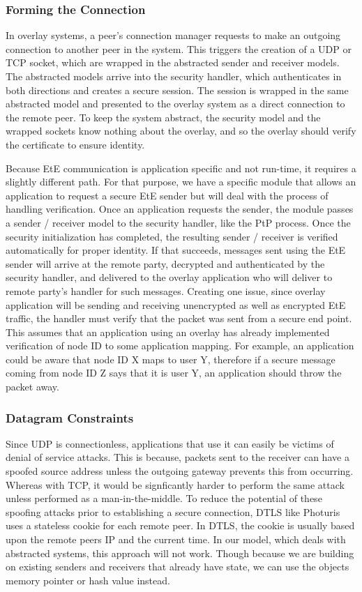 \documentclass[conference]{IEEEtran}
\begin{document}
\subsubsection{Forming the Connection}
In overlay systems, a peer's connection manager requests to make an outgoing
connection to another peer in the system.  This triggers the creation of a
UDP or TCP socket, which are wrapped in the abstracted sender and receiver
models.  The abstracted models arrive into the security handler, which
authenticates in both directions and creates a secure session.  The session is
wrapped in the same abstracted model and presented to the overlay system as a
direct connection to the remote peer.  To keep the system abstract, the security
model and the wrapped sockets know nothing about the overlay, and so the overlay
should verify the certificate to ensure identity.

Because EtE communication is application specific and not run-time, it requires
a slightly different path.  For that purpose, we have a specific module that
allows an application to request a secure EtE sender but will deal with the
process of handling verification.  Once an application requests the sender, the
module passes a sender / receiver model to the security handler, like the PtP
process.  Once the security initialization has completed, the
resulting sender / receiver is verified automatically for proper identity.
If that succeeds, messages sent using the EtE sender will arrive at the remote
party, decrypted and authenticated by the security handler, and delivered to the
overlay application who will deliver to remote party's handler for such messages.
Creating one issue, since overlay application will be sending and receiving
unencrypted as well as encrypted EtE traffic, the handler must verify that the
packet was sent from a secure end point.  This assumes that an application using
an overlay has already implemented verification of node ID to some application
mapping.  For example, an application could be aware that node ID X maps to user
Y, therefore if a secure message coming from node ID Z says that it is user Y,
an application should throw the packet away.

\subsubsection{Datagram Constraints}
Since UDP is connectionless, applications that use it can easily be victims of
denial of service attacks.  This is because, packets sent to the receiver can
have a spoofed source address unless the outgoing gateway prevents this from
occurring.  Whereas with TCP, it would be signficantly harder to perform the
same attack unless performed as a man-in-the-middle.  To reduce the potential
of these spoofing attacks prior to establishing a secure connection, DTLS like
Photuris~\cite{photuris} uses a stateless cookie for each remote peer.  In
DTLS, the cookie is usually based upon the remote peers IP and the current
time.  In our model, which deals with abstracted systems, this approach will
not work.  Though because we are building on existing senders and receivers
that already have state, we can use the objects memory pointer or hash value
instead.
\end{document}

